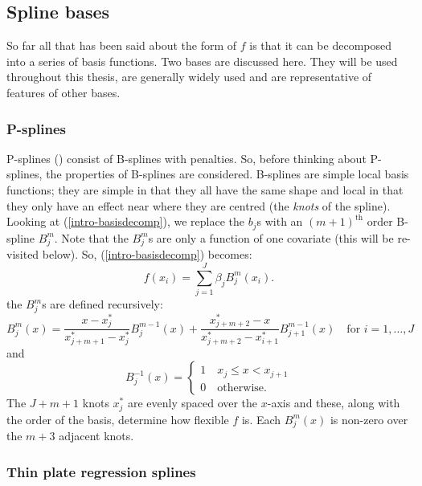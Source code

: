\subsection{Spline bases}

So far all that has been said about the form of $f$ is that it can be decomposed into a series of basis functions. Two bases are discussed here. They will be used throughout this thesis, are generally widely used and are representative of features of other bases.

\subsubsection{P-splines}

P-splines (\cite{eilersmarx96}) consist of B-splines with penalties. So, before thinking about P-splines, the properties of B-splines are considered. B-splines are simple local basis functions; they are simple in that they all have the same shape and local in that they only have an effect near where they are centred (the \textit{knots} of the spline). Looking at (\ref{intro-basisdecomp}), we replace the $b_j$s with an $(m+1)^\text{th}$ order B-spline $B_j^m$. Note that the $B_j^m$s are only a function of one covariate (this will be re-visited below). So, (\ref{intro-basisdecomp}) becomes:
\begin{equation}
f(x_i) = \sum_{j=1}^J \beta_j B^m_j(x_i).
\label{intro-basisdecomp}
\end{equation}
the $B_j^m$s are defined recursively:
\begin{equation}
B_j^m(x) = \frac{x-x^*_j}{x^*_{j+m+1} - x^*_j} B_j^{m-1}(x) + \frac{x^*_{j+m+2} -x}{x^*_{j+m+2} - x^*_{i+1}} B_{j+1}^{m-1}(x) \quad \text{for } i=1,\ldots,J
\end{equation}
and
\begin{equation}
 B_j^{-1}(x)=\begin{cases}
1 \quad x_j \leq x < x_{j+1}\\
0 \quad \text{otherwise}. 
\end{cases}
\end{equation}
The $J+m+1$ knots $x^*_j$ are evenly spaced over the $x$-axis and these, along with the order of the basis, determine how flexible $f$ is. Each $B^m_j(x)$ is non-zero over the $m+3$ adjacent knots.

\subsubsection{Thin plate regression splines}
\label{GAMtprs}
\label{GAMtprspenalty}

